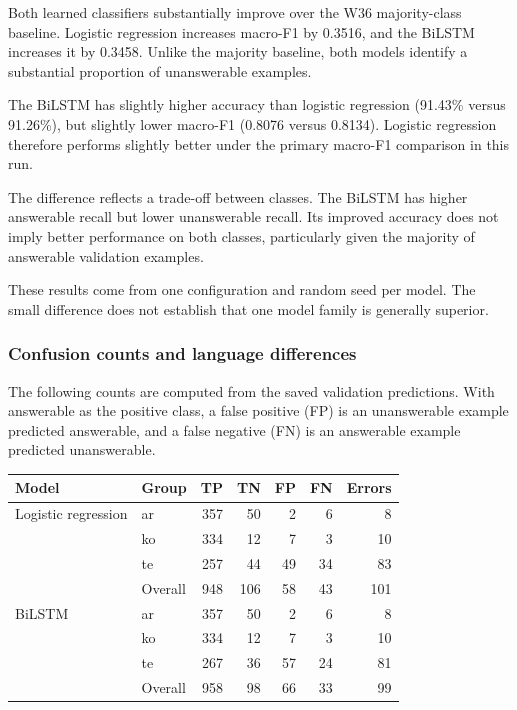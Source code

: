 \documentclass[11pt,a4paper]{article}
\begin{document}
Both learned classifiers substantially improve over the W36
majority-class baseline. Logistic regression increases macro-F1 by
0.3516, and the BiLSTM increases it by 0.3458. Unlike the majority
baseline, both models identify a substantial proportion of
unanswerable examples.

The BiLSTM has slightly higher accuracy than logistic regression
(91.43\% versus 91.26\%), but slightly lower macro-F1
(0.8076 versus 0.8134). Logistic regression therefore performs slightly
better under the primary macro-F1 comparison in this run.

The difference reflects a trade-off between classes. The BiLSTM has
higher answerable recall but lower unanswerable recall. Its improved
accuracy does not imply better performance on both classes, particularly
given the majority of answerable validation examples.

These results come from one configuration and random seed per model.
The small difference does not establish that one model family is
generally superior.

\subsubsection{Confusion counts and language differences}

The following counts are computed from the saved validation
predictions. With answerable as the positive class, a false positive
(FP) is an unanswerable example predicted answerable, and a false
negative (FN) is an answerable example predicted unanswerable.

\begin{center}
\small
\begin{tabular}{llrrrrr}
\toprule
Model & Group & TP & TN & FP & FN & Errors \\
\midrule
Logistic regression & ar      & 357 & 50  & 2  & 6  & 8 \\
                    & ko      & 334 & 12  & 7  & 3  & 10 \\
                    & te      & 257 & 44  & 49 & 34 & 83 \\
                    & Overall & 948 & 106 & 58 & 43 & 101 \\
\midrule
BiLSTM              & ar      & 357 & 50  & 2  & 6  & 8 \\
                    & ko      & 334 & 12  & 7  & 3  & 10 \\
                    & te      & 267 & 36  & 57 & 24 & 81 \\
                    & Overall & 958 & 98  & 66 & 33 & 99 \\
\bottomrule
\end{tabular}
\end{center}
\end{document}
